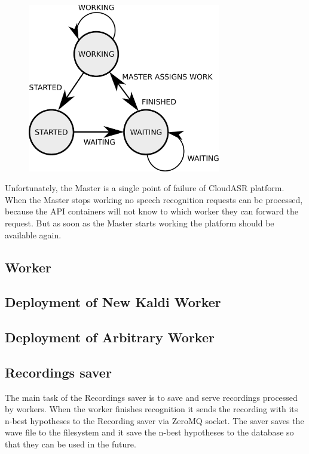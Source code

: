 \begin{figure}
  \centering
  \includegraphics[width=0.75\textwidth]{./img/worker-state.pdf}

  \label{fig:worker-state}
  \caption{}
\end{figure}

Unfortunately, the Master is a single point of failure of CloudASR platform.
When the Master stops working no speech recognition requests can be processed,
  because the API containers will not know to which worker they can forward the request.
But as soon as the Master starts working the platform should be available again.


\subsection{Worker}




\blindtext

\subsection{Deployment of New Kaldi Worker}
\blindtext

\subsection{Deployment of Arbitrary Worker}
\blindtext

\subsection{Recordings saver}
The main task of the Recordings saver is to save and serve recordings processed by workers.
When the worker finishes recognition it sends the recording with its n-best hypotheses to the Recording saver via ZeroMQ socket.
The saver saves the wave file to the filesystem and it save the n-best hypotheses to the database so that they can be used in the future.


